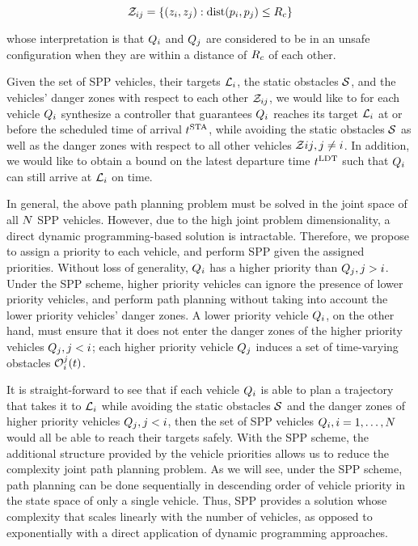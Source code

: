 \begin{equation}
\mathcal{Z}_{ij} = \{(z_i, z_j): \text{dist}(p_i, p_j) \le R_c\}
\end{equation}

\noindent whose interpretation is that $Q_{i}$ and $Q_{j}$ are considered to be in an unsafe configuration when they are within a distance of $R_c$ of each other.

Given the set of SPP vehicles, their targets $\mathcal{L}_i$, the static obstacles $\mathcal{S}$, and the vehicles' danger zones with respect to each other $\mathcal{Z}_{ij}$, we would like to for each vehicle $Q_{i}$ synthesize a controller that guarantees $Q_{i}$ reaches its target $\mathcal{L}_i$ at or before the scheduled time of arrival $t^\text{STA}$, while avoiding the static obstacles $\mathcal{S}$ as well as the danger zones with respect to all other vehicles $\mathcal{Z}{ij}, j\neq i$. In addition, we would like to obtain a bound on the latest departure time $t^\text{LDT}$ such that $Q_{i}$ can still arrive at $\mathcal{L}_i$ on time.

In general, the above path planning problem must be solved in the joint space of all $N$ SPP vehicles. However, due to the high joint problem dimensionality, a direct dynamic programming-based solution is intractable. Therefore, we propose to assign a priority to each vehicle, and perform SPP given the assigned priorities. Without loss of generality, $Q_{i}$ has a higher priority than $Q_{j}, j>i$. Under the SPP scheme, higher priority vehicles can ignore the presence of lower priority vehicles, and perform path planning without taking into account the lower priority vehicles' danger zones. A lower priority vehicle $Q_{i}$, on the other hand, must ensure that it does not enter the danger zones of the higher priority vehicles $Q_{j}, j<i$; each higher priority vehicle $Q_{j}$ induces a set of time-varying obstacles $\mathcal{O}_i^j(t)$.

It is straight-forward to see that if each vehicle $Q_{i}$ is able to plan a trajectory that takes it to $\mathcal{L}_i$ while avoiding the static obstacles $\mathcal{S}$ and the danger zones of higher priority vehicles $Q_{j}, j<i$, then the set of SPP vehicles $Q_{i}, i=1,\ldots,N$ would all be able to reach their targets safely. With the SPP scheme, the additional structure provided by the vehicle priorities allows us to reduce the complexity joint path planning problem. As we will see, under the SPP scheme, path planning can be done sequentially in descending order of vehicle priority in the state space of only a single vehicle. Thus, SPP provides a solution whose complexity that scales linearly with the number of vehicles, as opposed to exponentially with a direct application of dynamic programming approaches.

